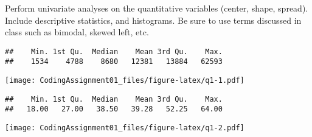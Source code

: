 \documentclass[
]{article}
\newenvironment{Shaded}{\begin{snugshade}}{\end{snugshade}}
\newcommand{\FunctionTok}[1]{\textcolor[rgb]{0.13,0.29,0.53}{\textbf{#1}}}
\newcommand{\NormalTok}[1]{#1}
\newcommand{\SpecialCharTok}[1]{\textcolor[rgb]{0.81,0.36,0.00}{\textbf{#1}}}
\begin{document}
Perform univariate analyses on the quantitative variables (center,
shape, spread). Include descriptive statistics, and histograms. Be sure
to use terms discussed in class such as bimodal, skewed left, etc.

\begin{Shaded}
\end{Shaded}

\begin{verbatim}
##    Min. 1st Qu.  Median    Mean 3rd Qu.    Max. 
##    1534    4788    8680   12381   13884   62593
\end{verbatim}

\begin{Shaded}
\end{Shaded}

\texttt{[image: CodingAssignment01\_files/figure-latex/q1-1.pdf]}

\begin{Shaded}
\end{Shaded}

\begin{verbatim}
##    Min. 1st Qu.  Median    Mean 3rd Qu.    Max. 
##   18.00   27.00   38.50   39.28   52.25   64.00
\end{verbatim}

\begin{Shaded}
\end{Shaded}

\texttt{[image: CodingAssignment01\_files/figure-latex/q1-2.pdf]}

\begin{Shaded}
\end{Shaded}
\end{document}
